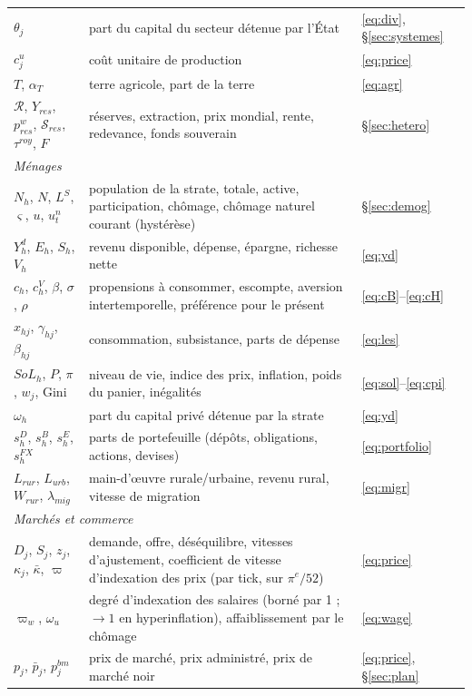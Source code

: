 \documentclass[11pt,a4paper]{article}
\begin{document}
\begin{longtable}{p{4.3cm}p{7.8cm}p{3.3cm}}
$\theta_j$ & part du capital du secteur détenue par l'État & \eqref{eq:div}, \S\ref{sec:systemes}\\
$c^u_j$ & coût unitaire de production & \eqref{eq:price}\\
$T$, $\alpha_T$ & terre agricole, part de la terre & \eqref{eq:agr}\\
$\mathcal{R}$, $Y_{res}$, $p^w_{res}$, $\mathcal{S}_{res}$, $\tau^{roy}$, $F$ & réserves, extraction, prix mondial, rente, redevance, fonds souverain & \S\ref{sec:hetero}\\
\midrule
\multicolumn{3}{l}{\emph{Ménages}}\\
$N_h$, $N$, $L^S$, $\varsigma$, $u$, $u^n_t$ & population de la strate, totale, active, participation, chômage, chômage naturel courant (hystérèse) & \S\ref{sec:demog}\\
$Y^d_h$, $E_h$, $S_h$, $V_h$ & revenu disponible, dépense, épargne, richesse nette & \eqref{eq:yd}\\
$c_h$, $c^V_h$, $\beta$, $\sigma$, $\rho$ & propensions à consommer, escompte, aversion intertemporelle, préférence pour le présent & \eqref{eq:cB}--\eqref{eq:cH}\\
$x_{hj}$, $\gamma_{hj}$, $\beta_{hj}$ & consommation, subsistance, parts de dépense & \eqref{eq:les}\\
$SoL_h$, $P$, $\pi$, $w_j$, Gini & niveau de vie, indice des prix, inflation, poids du panier, inégalités & \eqref{eq:sol}--\eqref{eq:cpi}\\
$\omega_h$ & part du capital privé détenue par la strate & \eqref{eq:yd}\\
$s^D_h$, $s^B_h$, $s^E_h$, $s^{FX}_h$ & parts de portefeuille (dépôts, obligations, actions, devises) & \eqref{eq:portfolio}\\
$L_{rur}$, $L_{urb}$, $W_{rur}$, $\lambda_{mig}$ & main-d'œuvre rurale/urbaine, revenu rural, vitesse de migration & \eqref{eq:migr}\\
\midrule
\multicolumn{3}{l}{\emph{Marchés et commerce}}\\
$D_j$, $S_j$, $z_j$, $\kappa_j$, $\bar\kappa$, $\varpi$ & demande, offre, déséquilibre, vitesses d'ajustement, coefficient de vitesse d'indexation des prix (par tick, sur $\pi^e/52$) & \eqref{eq:price}\\
$\varpi_w$, $\omega_u$ & degré d'indexation des salaires (borné par 1 ; $\to1$ en hyperinflation), affaiblissement par le chômage & \eqref{eq:wage}\\
$p_j$, $\bar p_j$, $p^{bm}_j$ & prix de marché, prix administré, prix de marché noir & \eqref{eq:price}, \S\ref{sec:plan}\\

\end{longtable}
\end{document}
